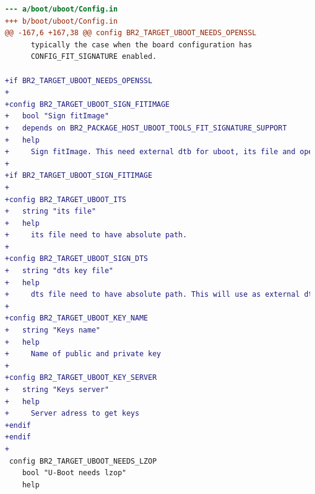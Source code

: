 \documentclass[aspectratio=169]{beamer}
\begin{document}
\begin{frame}[fragile]
\begin{lstlisting}[language=diff,basicstyle=\fontsize{5}{5}\selectfont\ttfamily\color{white}]
--- a/boot/uboot/Config.in
+++ b/boot/uboot/Config.in
@@ -167,6 +167,38 @@ config BR2_TARGET_UBOOT_NEEDS_OPENSSL
 	  typically the case when the board configuration has
 	  CONFIG_FIT_SIGNATURE enabled.
 
+if BR2_TARGET_UBOOT_NEEDS_OPENSSL
+
+config BR2_TARGET_UBOOT_SIGN_FITIMAGE
+	bool "Sign fitImage"
+	depends on BR2_PACKAGE_HOST_UBOOT_TOOLS_FIT_SIGNATURE_SUPPORT
+	help
+	  Sign fitImage. This need external dtb for uboot, its file and openssl key.
+
+if BR2_TARGET_UBOOT_SIGN_FITIMAGE
+
+config BR2_TARGET_UBOOT_ITS
+	string "its file"
+	help
+	  its file need to have absolute path.
+
+config BR2_TARGET_UBOOT_SIGN_DTS
+	string "dts key file"
+	help
+	  dts file need to have absolute path. This will use as external dtb.
+
+config BR2_TARGET_UBOOT_KEY_NAME
+	string "Keys name"
+	help
+	  Name of public and private key
+
+config BR2_TARGET_UBOOT_KEY_SERVER
+	string "Keys server"
+	help
+	  Server adress to get keys
+endif
+endif
+
 config BR2_TARGET_UBOOT_NEEDS_LZOP
 	bool "U-Boot needs lzop"
 	help
\end{lstlisting}
\end{frame}
\end{document}
